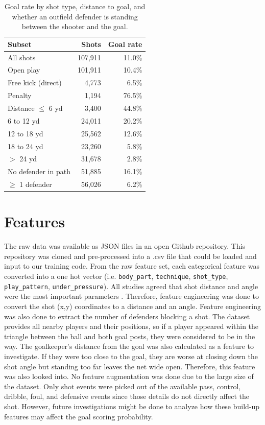 \documentclass[11pt]{article}
\begin{document}
\begin{table}[h]
  \centering
  \small
  \begin{tabular}{lrr}
    \hline
    \textbf{Subset} & \textbf{Shots} & \textbf{Goal rate} \\
    \hline
    All shots           & 107,911 & 11.0\% \\
    Open play           & 101,911 & 10.4\% \\
    Free kick (direct)  & 4,773   & 6.5\%  \\
    Penalty             & 1,194   & 76.5\% \\
    \hline
    Distance $\le$ 6 yd & 3,400   & 44.8\% \\
    6 to 12 yd          & 24,011  & 20.2\% \\
    12 to 18 yd         & 25,562  & 12.6\% \\
    18 to 24 yd         & 23,260  & 5.8\%  \\
    $>$ 24 yd           & 31,678  & 2.8\%  \\
    \hline
    No defender in path & 51,885  & 16.1\% \\
    $\ge$ 1 defender    & 56,026  & 6.2\%  \\
    \hline
  \end{tabular}
  \caption{\label{tab:dataset}
    Goal rate by shot type, distance to goal, and whether an outfield defender is standing between the shooter and the goal.}
\end{table}

\section{Features}

The raw data was available as JSON files in an open Github repository. This repository was cloned and pre-processed into a .csv file that could be loaded and input to our training code. From the raw feature set, each categorical feature was converted into a one hot vector (i.e. \texttt{body\_part}, \texttt{technique}, \texttt{shot\_type}, \texttt{play\_pattern}, \texttt{under\_pressure}). All studies agreed that shot distance and angle were the most important parameters \citep{Fairchild2018, Bandara2024, Appiah2026}. Therefore, feature engineering was done to convert the shot (x,y) coordinates to a distance and an angle. Feature engineering was also done to extract the number of defenders blocking a shot. The dataset provides all nearby players and their positions, so if a player appeared within the triangle between the ball and both goal posts, they were considered to be in the way. The goalkeeper’s distance from the goal was also calculated as a feature to investigate. If they were too close to the goal, they are worse at closing down the shot angle but standing too far leaves the net wide open. Therefore, this feature was also looked into. No feature augmentation was done due to the large size of the dataset. Only shot events were picked out of the available pass, control, dribble, foul, and defensive events since those details do not directly affect the shot. However, future investigations might be done to analyze how these build-up features may affect the goal scoring probability. 
\end{document}
